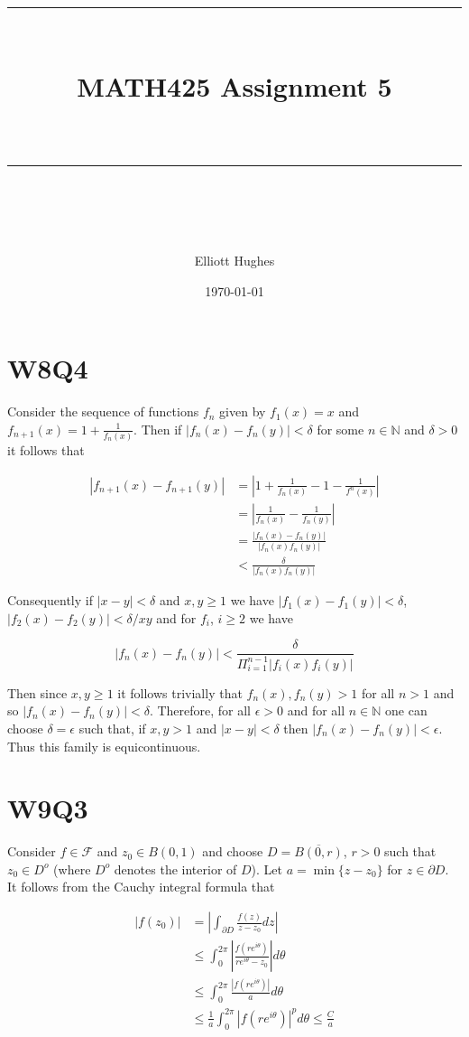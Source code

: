 \documentclass{article}
\title{	
	\normalfont\normalsize 
	\rule{\linewidth}{0.5pt}\\ %
	\vspace{14pt} %
	{\LARGE MATH425 Assignment 5\\ %
    \large \textit{} \\}
	\vspace{6pt} %
	\rule{\linewidth}{1pt}\\ %
}
\author{Elliott Hughes}
\date{\normalsize\today}
\begin{document}
\maketitle

\section*{W8Q4}
Consider the sequence of functions $f_n$ given by $f_1(x) = x$ and $f_{n+1}(x) = 1 + \frac{1}{f_n(x)}$. 
Then if $|f_n(x) - f_n(y)| < \delta$ for some $n \in \mathbb{N}$ and $\delta > 0$ it follows that 

\begin{align*}
    |f_{n+1}(x) - f_{n+1}(y)| &= \left|1 + \frac{1}{f_n(x)} -1 - \frac{1}{f^n(x)} \right| \\
    &= \left|\frac{1}{f_n(x)} - \frac{1}{f_n(y)} \right| \\
    &= \frac{|f_n(x) - f_n(y)|}{|f_n(x)f_n(y)|} \\
    &< \frac{\delta}{|f_n(x)f_n(y)|}
\end{align*}

Consequently if $|x - y| <\delta$ and $x,y \geq 1$ we have $|f_1(x) - f_1(y)| < \delta$, $|f_2(x) - f_2(y)| < \delta/xy$ 
and for $f_i$, $i \geq 2$ we have 

\begin{equation*}
	|f_n(x) - f_n(y)| < \frac{\delta}{\Pi_{i=1}^{n-1}|f_i(x)f_i(y)|}
\end{equation*}

Then since $x,y \geq 1$ it follows trivially that $f_n(x),f_n(y) > 1$ for all $n > 1$ and so $|f_n(x) - f_n(y)| < \delta$. 
Therefore, for all $\epsilon > 0$ and for all $n \in \mathbb{N}$ one can choose $\delta = \epsilon$ 
such that, if $x,y > 1$ and $|x -y | < \delta$ then $|f_n(x) -f_n(y)| < \epsilon$. Thus this family 
is equicontinuous.


\section*{W9Q3}
Consider $f \in \mathcal{F}$ and $z_0 \in B(0,1)$ and choose $D = \overline{B(0,r)}$, $r > 0$ such that 
$z_0 \in D^o$ (where $D^o$ denotes the interior of $D$). Let $a = \min\{z - z_0\}$ for 
$z \in \partial D$. It follows from the Cauchy integral formula that 

\begin{align*}
	|f(z_0)| &= \left|\int_{\partial D}\frac{f(z)}{z-z_0}dz \right| \\
	&\leq \int_0^{2\pi}\left|\frac{f(re^{i\theta})}{re^{i\theta}-z_0} \right|d\theta \\
	&\leq \int_0^{2\pi}\frac{|f(re^{i\theta})|}{a}d\theta \\
	&\leq \frac{1}{a}\int_0^{2\pi}|f(re^{i\theta})|^pd\theta \leq \frac{C}{a}
\end{align*}
\end{document}
